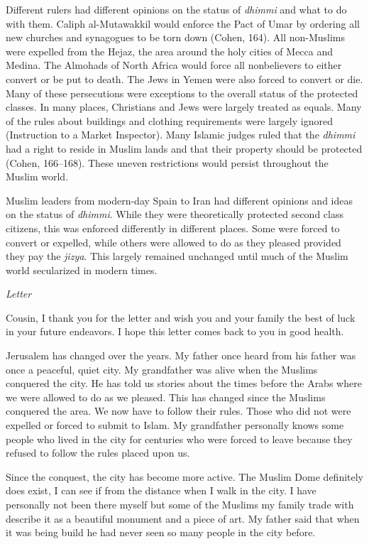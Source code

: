 \documentclass[12pt]{article}
\begin{document}
Different rulers had different opinions on the status of \emph{dhimmi} and what to do with them.
Caliph al-Mutawakkil would enforce the Pact of Umar by ordering all new churches and synagogues to be torn down (Cohen, 164).
All non-Muslims were expelled from the Hejaz, the area around the holy cities of Mecca and Medina.
The Almohads of North Africa would force all nonbelievers to either convert or be put to death.
The Jews in Yemen were also forced to convert or die.
Many of these persecutions were exceptions to the overall status of the protected classes.
In many places, Christians and Jews were largely treated as equals.
Many of the rules about buildings and clothing requirements were largely ignored (Instruction to a Market Inspector).
Many Islamic judges ruled that the \emph{dhimmi} had a right to reside in Muslim lands and that their property should be protected (Cohen, 166--168).
These uneven restrictions would persist throughout the Muslim world.

Muslim leaders from modern-day Spain to Iran had different opinions and ideas on the status of \emph{dhimmi}.
While they were theoretically protected second class citizens, this was enforced differently in different places.
Some were forced to convert or expelled, while others were allowed to do as they pleased provided they pay the \emph{jizya}.
This largely remained unchanged until much of the Muslim world secularized in modern times.

\pagebreak

\begin{center}
    \emph{Letter}
\end{center}

Cousin, I thank you for the letter and wish you and your family the best of luck in your future endeavors.
I hope this letter comes back to you in good health.

Jerusalem has changed over the years.
My father once heard from his father was once a peaceful, quiet city.
My grandfather was alive when the Muslims conquered the city.
He has told us stories about the times before the Arabs where we were allowed to do as we pleased.
This has changed since the Muslims conquered the area.
We now have to follow their rules.
Those who did not were expelled or forced to submit to Islam.
My grandfather personally knows some people who lived in the city for centuries who were forced to leave because they refused to follow the rules placed upon us.

Since the conquest, the city has become more active.
The Muslim Dome definitely does exist, I can see if from the distance when I walk in the city.
I have personally not been there myself but some of the Muslims my family trade with describe it as a beautiful monument and a piece of art.
My father said that when it was being build he had never seen so many people in the city before.
\end{document}
